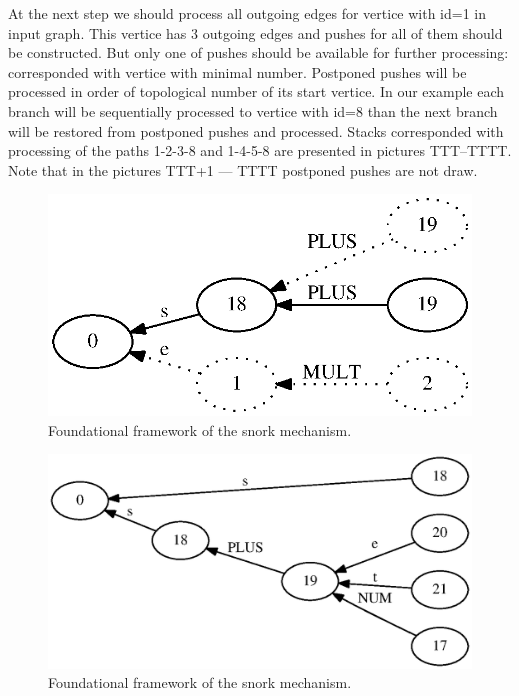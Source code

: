 \documentclass{sigplanconf}
\begin{document}
At the next step we should process all outgoing edges for vertice with id=1 in input graph. This vertice has 3 outgoing edges and pushes for all of them should be constructed. But only one of pushes should be available for further processing: corresponded with vertice with minimal number. Postponed pushes will be processed in order of topological number of its start vertice. In our example each branch will be sequentially processed to vertice with id=8 than the next branch will be restored from postponed pushes and processed. Stacks corresponded with processing of the paths 1-2-3-8 and 1-4-5-8  are presented in pictures TTT--TTTT. Note that in the pictures TTT+1 — TTTT postponed pushes are not draw.

\begin{figure}
    \begin{center}
        \includegraphics[scale=0.65]{Graphs/stack_1_3_m.eps}
    \end{center}
    \caption{Foundational framework of the snork mechanism.}
    \label{fig-ffsm}
\end{figure}

\begin{figure}
    \begin{center}
        \includegraphics[scale=0.6]{Graphs/stack_1_4.eps}
    \end{center}
    \caption{Foundational framework of the snork mechanism.}
    \label{fig-ffsm}
\end{figure}
\end{document}
